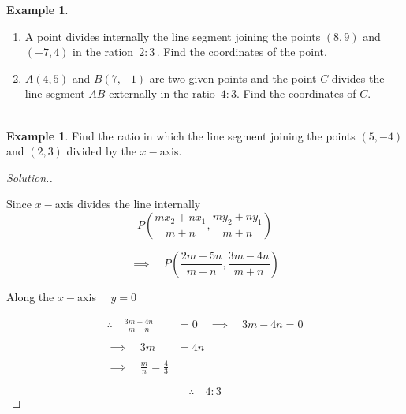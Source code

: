 \documentclass[11pt,a4paper]{article}
\theoremstyle{definition}
\newtheorem{example}[thm]{Example}
\newenvironment{solution}
  {\renewcommand{\qedsymbol}{}\begin{proof}[\textit{Solution}.]}
  {\end{proof}}
\begin{document}
\pagebreak
\begin{example}

\begin{enumerate}
\item A point divides internally the line segment joining the points $(8,9)$ and $(-7,4)$ in the ration $\, 2:3\,$. Find the coordinates  of the point.

\item $A(4,5)$ and $B(7,-1)$ are two given points and the point $C$ divides the line segment $AB$ externally in the ratio $\, 4: 3$. Find the coordinates of $C$.\\\\
\end{enumerate}
\end{example}
\begin{example}

Find the ratio in which the line segment joining the points $(5,-4)$ and $(2,3)$ divided by the $x-$axis.
\end{example}
\begin{solution}

\begin{figure}[H]
\centering
{}
\end{figure}
















Since $x-$axis divides the line internally 
$$P\left(\frac{mx_2 + nx_1}{m + n}, \frac{my_2 + ny_1}{m + n}\right)$$

$$\implies \quad  P\left(\frac{2m + 5n}{m + n}, \frac{3m - 4n}{m + n}\right)$$



Along the $x-$axis $\quad  y = 0$

\begin{align*}
\therefore\quad  \frac{3m - 4n}{m + n} & = 0 \quad \implies \quad  3m - 4n = 0\\\\
\implies \quad  3m & = 4n\\\\
\implies \quad  \frac{m}{n}= \frac{4}{3}
\end{align*}


$$\therefore\quad  4: 3$$
\end{solution}
\end{document}
